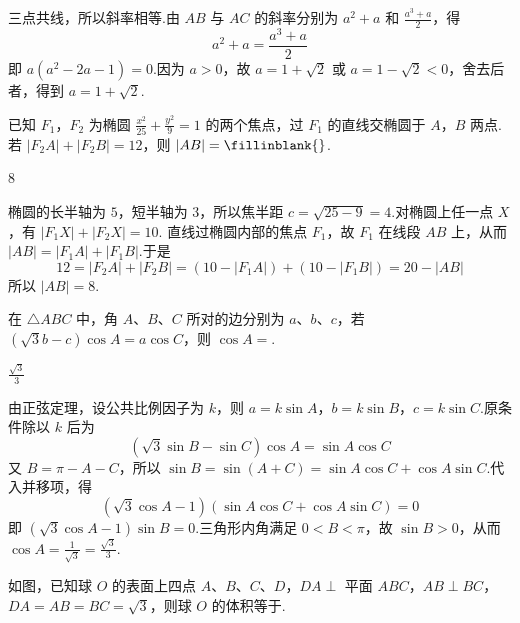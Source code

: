 \begin{solution}
三点共线，所以斜率相等.由 \(AB\) 与 \(AC\) 的斜率分别为
\(a^2+a\) 和 \(\frac{a^3+a}{2}\)，得
\[
a^2+a=\frac{a^3+a}{2}
\]
即 \(a(a^2-2a-1)=0\).因为 \(a>0\)，故
\(a=1+\sqrt2\) 或 \(a=1-\sqrt2<0\)，舍去后者，得到 \(a=1+\sqrt2\).
\end{solution}

\begin{problem}
已知 \(F_1\)，\(F_2\) 为椭圆 \(\frac{x^2}{25} + \frac{y^2}{9} = 1\) 的两个焦点，过 \(F_1\) 的直线交椭圆于 \(A\)，\(B\) 两点. 若 \(|F_2A| + |F_2B| = 12\)，则 \(|AB| =\fillinblank{}\).
\end{problem}

\begin{answer}
\(8\)
\end{answer}

\begin{solution}
椭圆的长半轴为 \(5\)，短半轴为 \(3\)，所以焦半距
\(c=\sqrt{25-9}=4\).对椭圆上任一点 \(X\)，有 \(|F_1X|+|F_2X|=10\).
直线过椭圆内部的焦点 \(F_1\)，故 \(F_1\) 在线段 \(AB\) 上，从而
\(|AB|=|F_1A|+|F_1B|\).于是
\[
12=|F_2A|+|F_2B|=(10-|F_1A|)+(10-|F_1B|)=20-|AB|
\]
所以 \(|AB|=8\).
\end{solution}

\begin{problem}
在 \(\triangle ABC\) 中，角 \(A\)、\(B\)、\(C\) 所对的边分别为 \(a\)、\(b\)、\(c\)，若 \((\sqrt{3} b - c) \cos A = a \cos C\)，则 \(\cos A =\)\fillinblank{}.
\end{problem}

\begin{answer}
\(\frac{\sqrt{3}}{3}\)
\end{answer}

\begin{solution}
由正弦定理，设公共比例因子为 \(k\)，则
\(a=k\sin A\)，\(b=k\sin B\)，\(c=k\sin C\).原条件除以 \(k\) 后为
\[
(\sqrt3\sin B-\sin C)\cos A=\sin A\cos C
\]
又 \(B=\pi-A-C\)，所以 \(\sin B=\sin(A+C)=\sin A\cos C+\cos A\sin C\).代入并移项，得
\[
(\sqrt3\cos A-1)(\sin A\cos C+\cos A\sin C)=0
\]
即 \((\sqrt3\cos A-1)\sin B=0\).三角形内角满足 \(0<B<\pi\)，故 \(\sin B>0\)，从而
\(\cos A=\frac1{\sqrt3}=\frac{\sqrt3}{3}\).
\end{solution}

\begin{problem}
如图，已知球 \(O\) 的表面上四点 \(A\)、\(B\)、\(C\)、\(D\)，\(DA \perp\) 平面 \(ABC\)，\(AB \perp BC\)，\(DA = AB = BC = \sqrt{3}\)，则球 \(O\) 的体积等于\fillinblank{}.

\end{problem}

